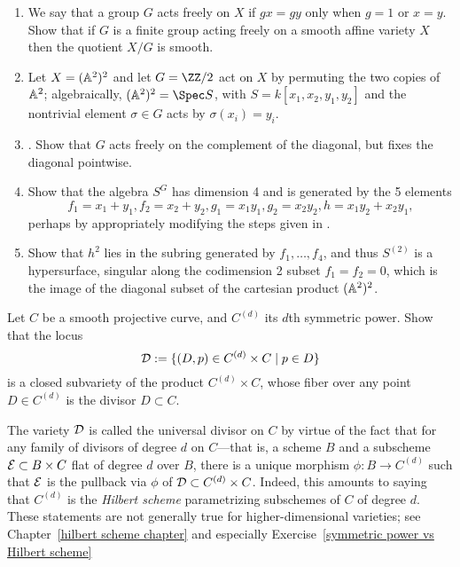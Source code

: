 \begin{exercise}
\begin{enumerate}
 \item We say that a group $G$ acts freely on $X$ if $gx = gy$ only when $g =1$ or $x=y$. Show that
 if $G$ is a finite group acting freely on a smooth affine variety $X$ then the quotient $X/G$ is smooth.
\item Let $X = (\AA^{2})^{2}$ and let $G = \ZZ/2$ act on $X$ by permuting the two copies of $\AA^{2}$; algebraically,
$(\AA^{2})^{2} = \Spec S$, with $S = k[x_{1},x_{2}, y_{1}, y_{2}]$ and the nontrivial element $\sigma\in G$ acts by
$\sigma(x_{i}) = y_{i}$. 
\item. Show that $G$ acts freely on the complement of the diagonal, but fixes the diagonal pointwise.
\item Show that the algebra $S^{G}$ has dimension 4 and is generated by the 5 elements
$$ 
f_{1} = x_{1}+y_{1}, f_{2} = x_{2}+y_{2}, g_{1} = x_{1}y_{1}, g_{2} = x_{2}y_{2}, h = x_{1}y_{2}+x_{2}y_{1},
$$
perhaps by appropriately modifying the steps given in \cite[Exercise 1.6]{E}. 
\item Show that $h^2$ lies in the subring generated by $f_1,\dots, f_4$, and thus $S^{(2)}$ is a hypersurface, singular
along the  codimension 2 subset $f_{1} = f_{2} = 0$, which is the image of the diagonal subset of the 
cartesian product $(\AA^{2})^{2}$.
\end{enumerate}
\end{exercise}


\begin{exercise}\label{universal divisor}
Let $C$ be a smooth projective curve, and $C^{(d)}$ its $d$th symmetric power. Show that the locus
$$
\cD := \{ (D, p) \in C^{(d)} \times C \mid p \in D \}
$$
is a closed subvariety of the product $C^{(d)} \times C$, whose fiber over any point $D \in C^{(d)}$ is the divisor $D \subset C$.

\end{exercise}

The variety $\cD$ is called the universal divisor on $C$ by virtue of the fact that for any family of divisors of degree $d$ on $C$---that is, a scheme $B$ and a subscheme $\cE \subset B \times C$ flat of degree $d$ over $B$, there is a unique morphism $\phi : B \to C^{(d)}$ such that $\cE$ is the pullback via $\phi$ of $\cD\subset C^{(d)} \times C$. Indeed, this amounts to saying that $C^{(d)}$ is the \emph{Hilbert scheme} parametrizing subschemes of $C$ of degree $d$. These statements are not generally true for higher-dimensional varieties; see Chapter~\ref{hilbert scheme chapter} and especially Exercise~\ref{symmetric power vs Hilbert scheme}



